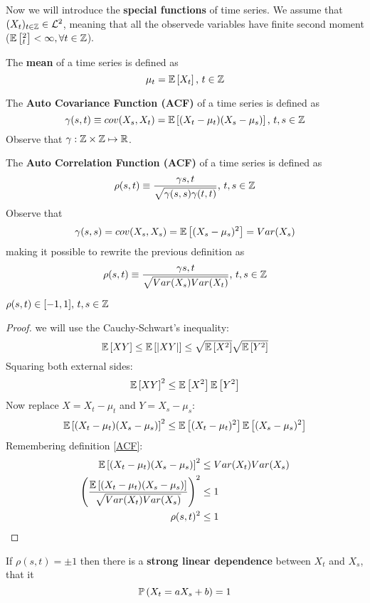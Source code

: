 Now we will introduce the \textbf{special functions} of time series. We assume that $(X_t)_{t\in\mathbb{Z}}\in\mathcal{L}^{2}$, meaning that all the observede variables have finite second moment ($\mathbb{E}\left[^2_t\right]<\infty, \forall t\in\mathbb{Z}$).
\begin{definition}
    The \textbf{mean} of a time series is defined as
    \[
        \mu_t=\mathbb{E}\left[X_t\right] \text{, } t\in\mathbb{Z}  
    \]
\end{definition}
\begin{definition}
    The \textbf{Auto Covariance Function (ACF)} of a time series is defined as
    \[
        \gamma(s,t)\equiv cov(X_s,X_t)=\mathbb{E}\left[(X_t-\mu_t)(X_s-\mu_s)\right] \text{, } t,s\in\mathbb{Z}
    \]
    Observe that $\gamma:\mathbb{Z}\times\mathbb{Z}\mapsto\mathbb{R}$. 
\end{definition}
\begin{definition} \label{ACF}
    The \textbf{Auto Correlation Function (ACF)} of a time series is defined as
    \[
        \rho(s,t)\equiv \frac{\gamma{s,t}}{\sqrt{\gamma(s,s)\gamma(t,t)}} \text{, } t,s\in\mathbb{Z}
    \]
    Observe that
    \[
        \gamma(s,s)=cov(X_s,X_s)=\mathbb{E}\left[(X_s-\mu_s)^2\right]=Var(X_s)
    \]
    making it possible to rewrite the previous definition as
    \[
        \rho(s,t)\equiv \frac{\gamma{s,t}}{\sqrt{Var(X_s)Var(X_t)}} \text{, } t,s\in\mathbb{Z}
    \]
\end{definition}
\begin{lemma}
    $\rho(s,t)\in[-1,1] \text{, } t,s\in\mathbb{Z}$
\end{lemma}
\begin{proof}
    we will use the Cauchy-Schwart's inequality:
    \[
        \mathbb{E}\left[XY\right] \le \mathbb{E}\left[\left|XY\right|\right] \le \sqrt{\mathbb{E}\left[X^2\right]}\sqrt{\mathbb{E}\left[Y^2\right]}
    \]
    Squaring both external sides:
    \[
        \mathbb{E}\left[XY\right]^2 \le \mathbb{E}\left[X^2\right]\mathbb{E}\left[Y^2\right]
    \]
    Now replace $X=X_t-\mu_t$ and $Y=X_s-\mu_s$:
    \[
        \mathbb{E}\left[(X_t-\mu_t)(X_s-\mu_s)\right]^2 \le \mathbb{E}\left[(X_t-\mu_t)^2\right]\mathbb{E}\left[(X_s-\mu_s)^2\right]
    \]
    Remembering definition \ref{ACF}:
    \begin{equation*}
        \begin{split}
            \mathbb{E}\left[(X_t-\mu_t)(X_s-\mu_s)\right]^2 &\le Var(X_t)Var(X_s)\\
            \left(\frac{\mathbb{E}\left[(X_t-\mu_t)(X_s-\mu_s)\right]}{\sqrt{Var(X_t)Var(X_s)}}\right)^2 &\le 1\\
            \rho(s,t)^2 &\le 1 \qedhere
        \end{split}
    \end{equation*}
\end{proof}
\begin{remark}
    If $\rho(s,t)=\pm 1$ then there is a \textbf{strong linear dependence} between $X_t$ and $X_s$, that it
    \[
        \mathbb{P}\left(X_t=aX_s+b\right)=1           
    \]
\end{remark}

